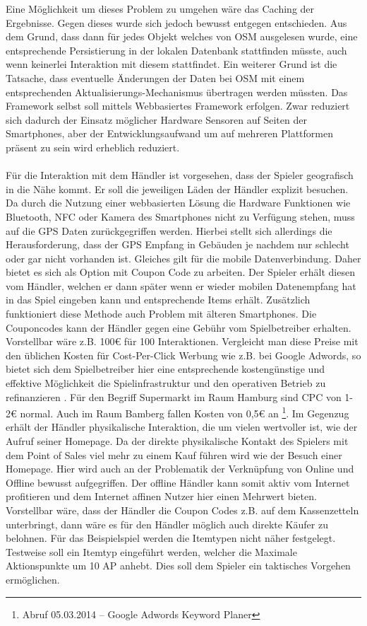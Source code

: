 Eine Möglichkeit um dieses Problem zu umgehen wäre das Caching der Ergebnisse. Gegen dieses wurde sich jedoch bewusst entgegen entschieden. Aus dem Grund, dass dann für jedes Objekt welches von OSM ausgelesen wurde, eine entsprechende Persistierung in der lokalen Datenbank stattfinden müsste, auch wenn keinerlei Interaktion mit diesem stattfindet. Ein weiterer Grund ist die Tatsache, dass eventuelle Änderungen der Daten bei OSM mit einem entsprechenden Aktualisierungs-Mechanismus übertragen werden müssten.
Das Framework selbst soll mittels Webbasiertes Framework erfolgen.
Zwar reduziert sich dadurch der Einsatz möglicher Hardware Sensoren auf Seiten der Smartphones, aber der Entwicklungsaufwand um auf mehreren Plattformen präsent zu sein wird erheblich reduziert.
\\\\
Für die Interaktion mit dem Händler ist vorgesehen, dass der Spieler geografisch in die Nähe kommt. Er soll die jeweiligen Läden der Händler explizit besuchen. Da durch die Nutzung einer webbasierten Lösung die Hardware Funktionen wie Bluetooth, NFC oder Kamera des Smartphones nicht zu Verfügung stehen, muss auf die GPS Daten zurückgegriffen werden.
Hierbei stellt sich allerdings die Herausforderung, dass der GPS Empfang in Gebäuden je nachdem nur schlecht oder gar nicht vorhanden ist. Gleiches gilt für die mobile Datenverbindung. Daher bietet es sich als Option mit Coupon Code zu arbeiten. Der Spieler erhält diesen vom Händler, welchen er dann später wenn er wieder mobilen Datenempfang hat in das Spiel eingeben kann und entsprechende Items erhält. Zusätzlich funktioniert diese Methode auch Problem mit älteren Smartphones. Die Couponcodes kann der Händler gegen eine Gebühr vom Spielbetreiber erhalten. Vorstellbar wäre z.B. 100€ für 100 Interaktionen. Vergleicht man diese Preise mit den üblichen Kosten für Cost-Per-Click Werbung wie z.B. bei Google Adwords, so bietet sich dem Spielbetreiber hier eine entsprechende kostengünstige und effektive Möglichkeit die Spielinfrastruktur und den operativen Betrieb zu refinanzieren \cite{Guerini.2010}. Für den Begriff Supermarkt im Raum Hamburg sind CPC von 1-2€ normal. Auch im Raum Bamberg fallen Kosten von 0,5€ an \footnote{Abruf 05.03.2014 -- Google Adwords Keyword Planer}. Im Gegenzug erhält der Händler physikalische Interaktion, die um vielen wertvoller ist, wie der Aufruf seiner Homepage. Da der direkte physikalische Kontakt des Spielers mit dem Point of Sales viel mehr zu einem Kauf führen wird wie der Besuch einer Homepage. Hier wird auch an der Problematik der Verknüpfung von Online und Offline bewusst aufgegriffen. Der offline Händler kann somit aktiv vom Internet profitieren und dem Internet affinen Nutzer hier einen Mehrwert bieten. Vorstellbar wäre, dass der Händler die Coupon Codes z.B. auf dem Kassenzetteln unterbringt, dann wäre es für den Händler möglich auch direkte Käufer zu belohnen.
Für das Beispielspiel werden die Itemtypen nicht näher festgelegt. Testweise soll ein Itemtyp eingeführt werden, welcher die Maximale Aktionspunkte um 10 AP anhebt. Dies soll dem Spieler ein taktisches Vorgehen ermöglichen.
